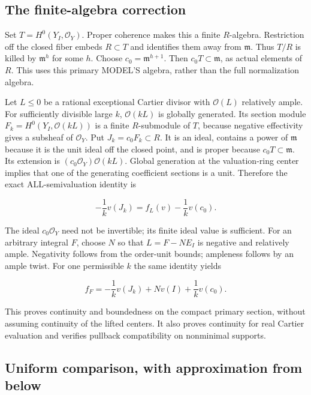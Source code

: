 \documentclass[11pt]{article}
\begin{document}
\subsection{The finite-algebra correction}

Set $T=H^0(Y_I,\mathcal O_Y)$. Proper coherence makes this a finite $R$-algebra. Restriction off the closed fiber embeds $R\subset T$ and identifies them away from $\mathfrak m$. Thus $T/R$ is killed by $\mathfrak m^h$ for some $h$. Choose $c_0=\mathfrak m^{h+1}$. Then $c_0T\subset\mathfrak m$, as actual elements of $R$. This uses this primary MODEL'S algebra, rather than the full normalization algebra.

Let $L\le0$ be a rational exceptional Cartier divisor with $\mathcal O(L)$ relatively ample. For sufficiently divisible large $k$, $\mathcal O(kL)$ is globally generated. Its section module $F_k=H^0(Y_I,\mathcal O(kL))$ is a finite $R$-submodule of $T$, because negative effectivity gives a subsheaf of $\mathcal O_Y$. Put $J_k=c_0F_k\subset R$. It is an ideal, contains a power of $\mathfrak m$ because it is the unit ideal off the closed point, and is proper because $c_0T\subset\mathfrak m$. Its extension is $(c_0\mathcal O_Y)\mathcal O(kL)$. Global generation at the valuation-ring center implies that one of the generating coefficient sections is a unit. Therefore the exact ALL-semivaluation identity is

\[
-\frac1k v(J_k)=f_L(v)-\frac1k v(c_0).
\]

The ideal $c_0\mathcal O_Y$ need not be invertible; its finite ideal value is sufficient. For an arbitrary integral $F$, choose $N$ so that $L=F-NE_I$ is negative and relatively ample. Negativity follows from the order-unit bounds; ampleness follows by an ample twist. For one permissible $k$ the same identity yields

\[
f_F=-\frac1k v(J_k)+N v(I)+\frac1k v(c_0).
\]

This proves continuity and boundedness on the compact primary section, without assuming continuity of the lifted centers. It also proves continuity for real Cartier evaluation and verifies pullback compatibility on nonminimal supports.

\subsection{Uniform comparison, with approximation from below}
\end{document}
